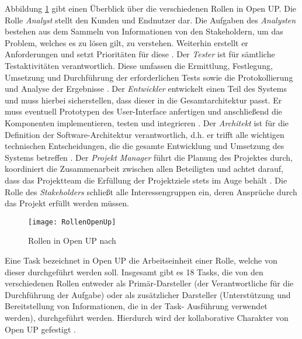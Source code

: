 Abbildung \ref{fig:RollenOpenUp} gibt einen Überblick über die verschiedenen Rollen in Open UP. Die Rolle \textit{Analyst} stellt den Kunden und Endnutzer dar. Die Aufgaben des \textit{Analysten} bestehen aus dem Sammeln von Informationen von den Stakeholdern, um das Problem, welches es zu lösen gilt, zu verstehen. Weiterhin erstellt er Anforderungen und setzt Prioritäten für diese \cite{OpenUPProcess}.\newline
Der \textit{Tester} ist für sämtliche Testaktivitäten verantwortlich. Diese umfassen die Ermittlung, Festlegung, Umsetzung und Durchführung der erforderlichen Tests sowie die Protokollierung und Analyse der Ergebnisse \cite{OpenUPProcess}.
Der \textit{Entwickler} entwickelt einen Teil des Systems und muss hierbei sicherstellen, dass dieser in die Gesamtarchitektur passt. Er muss eventuell Prototypen des User-Interface anfertigen und anschließend die Komponenten implementieren, testen und integrieren \cite{OpenUPProcess}.\newline
Der \textit{Architekt} ist für die Definition der Software-Architektur verantwortlich, d.h. er trifft alle wichtigen technischen Entscheidungen, die die gesamte Entwicklung und Umsetzung des Systems betreffen \cite{OpenUPProcess}.\newline
Der \textit{Projekt Manager} führt die Planung des Projektes durch, koordiniert die Zusammenarbeit zwischen allen Beteiligten und achtet darauf, dass das Projektteam die Erfüllung der Projektziele stets im Auge behält \cite{OpenUPProcess}.\newline
Die Rolle des \textit{Stakeholders} schließt alle Interessengruppen ein, deren Ansprüche durch das Projekt erfüllt werden müssen. \newline

\begin{figure}[htp]
\begin{center}
  \texttt{[image: RollenOpenUp]} %
  \caption{Rollen in Open UP nach \cite{openup}}
  \label{fig:RollenOpenUp}
\end{center}
\end{figure}

Eine Task bezeichnet in Open UP die Arbeitseinheit einer Rolle, welche von dieser durchgeführt werden soll. Insgesamt gibt es 18 Tasks, die von den verschiedenen Rollen entweder als Primär-Darsteller (der Verantwortliche für die Durchführung der Aufgabe) oder als zusätzlicher Darsteller (Unterstützung und Bereitstellung von Informationen, die in der Task- Ausführung verwendet werden), durchgeführt werden. Hierdurch wird der kollaborative Charakter von Open UP gefestigt \cite{eclipseopenup}.

